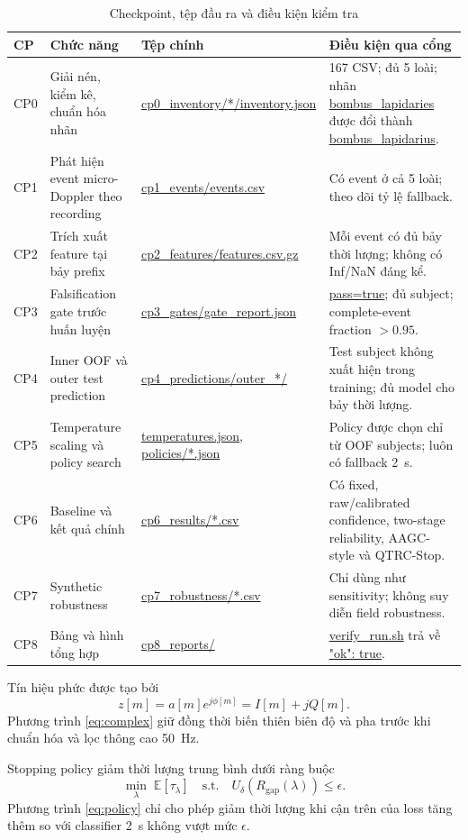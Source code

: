 \documentclass[12pt,draftclsnofoot,onecolumn]{IEEEtran}
\newcommand{\code}[1]{\url{#1}}
\begin{document}
\begin{table}[!t]
\caption{Checkpoint, tệp đầu ra và điều kiện kiểm tra}
\label{tab:checkpoints}
\centering
\small
\begin{tabularx}{\textwidth}{p{12mm}p{37mm}Y Y}
\toprule
CP & Chức năng & Tệp chính & Điều kiện qua cổng \\
\midrule
CP0 & Giải nén, kiểm kê, chuẩn hóa nhãn & \code{cp0_inventory/*/inventory.json} & 167 CSV; đủ 5 loài; nhãn \code{bombus_lapidaries} được đổi thành \code{bombus_lapidarius}. \\
CP1 & Phát hiện event micro-Doppler theo recording & \code{cp1_events/events.csv} & Có event ở cả 5 loài; theo dõi tỷ lệ fallback. \\
CP2 & Trích xuất feature tại bảy prefix & \code{cp2_features/features.csv.gz} & Mỗi event có đủ bảy thời lượng; không có Inf/NaN đáng kể. \\
CP3 & Falsification gate trước huấn luyện & \code{cp3_gates/gate_report.json} & \code{pass=true}; đủ subject; complete-event fraction $>0.95$. \\
CP4 & Inner OOF và outer test prediction & \code{cp4_predictions/outer_*/} & Test subject không xuất hiện trong training; đủ model cho bảy thời lượng. \\
CP5 & Temperature scaling và policy search & \code{temperatures.json}, \code{policies/*.json} & Policy được chọn chỉ từ OOF subjects; luôn có fallback 2~s. \\
CP6 & Baseline và kết quả chính & \code{cp6_results/*.csv} & Có fixed, raw/calibrated confidence, two-stage reliability, AAGC-style và QTRC-Stop. \\
CP7 & Synthetic robustness & \code{cp7_robustness/*.csv} & Chỉ dùng như sensitivity; không suy diễn field robustness. \\
CP8 & Bảng và hình tổng hợp & \code{cp8_reports/} & \code{verify_run.sh} trả về \code{"ok": true}. \\
\bottomrule
\end{tabularx}
\end{table}

Tín hiệu phức được tạo bởi
\begin{equation}
z[m]=a[m]e^{j\phi[m]}=I[m]+jQ[m].
\label{eq:complex}
\end{equation}
Phương trình \eqref{eq:complex} giữ đồng thời biến thiên biên độ và pha trước khi chuẩn hóa và lọc thông cao 50~Hz.

Stopping policy giảm thời lượng trung bình dưới ràng buộc
\begin{equation}
\min_{\lambda}\;\mathbb{E}[\tau_{\lambda}]
\quad \text{s.t.}\quad U_{\delta}(R_{\mathrm{gap}}(\lambda))\leq\epsilon.
\label{eq:policy}
\end{equation}
Phương trình \eqref{eq:policy} chỉ cho phép giảm thời lượng khi cận trên của loss tăng thêm so với classifier 2~s không vượt mức $\epsilon$.
\end{document}
